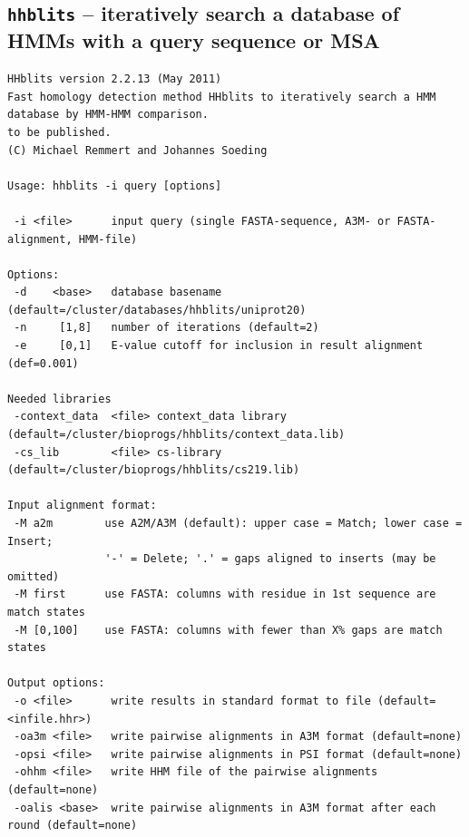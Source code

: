 \documentclass[11pt,a4paper]{article}
\begin{document}
\subsection{{\tt hhblits} -- iteratively search a database of HMMs with a query sequence or MSA}

\small \begin{verbatim}
HHblits version 2.2.13 (May 2011)
Fast homology detection method HHblits to iteratively search a HMM database by HMM-HMM comparison.
to be published.
(C) Michael Remmert and Johannes Soeding

Usage: hhblits -i query [options]                                                             

 -i <file>      input query (single FASTA-sequence, A3M- or FASTA-alignment, HMM-file)   

Options:                                                                                 
 -d    <base>   database basename (default=/cluster/databases/hhblits/uniprot20)                                           
 -n     [1,8]   number of iterations (default=2)                                        
 -e     [0,1]   E-value cutoff for inclusion in result alignment (def=0.001)                

Needed libraries                                                                         
 -context_data  <file> context_data library (default=/cluster/bioprogs/hhblits/context_data.lib)                                 
 -cs_lib        <file> cs-library (default=/cluster/bioprogs/hhblits/cs219.lib)                                           

Input alignment format:                                                       
 -M a2m        use A2M/A3M (default): upper case = Match; lower case = Insert;
               '-' = Delete; '.' = gaps aligned to inserts (may be omitted)   
 -M first      use FASTA: columns with residue in 1st sequence are match states
 -M [0,100]    use FASTA: columns with fewer than X% gaps are match states   

Output options:                                                                          
 -o <file>      write results in standard format to file (default=<infile.hhr>)          
 -oa3m <file>   write pairwise alignments in A3M format (default=none)                   
 -opsi <file>   write pairwise alignments in PSI format (default=none)                   
 -ohhm <file>   write HHM file of the pairwise alignments (default=none)                 
 -oalis <base>  write pairwise alignments in A3M format after each round (default=none)  


\end{verbatim}
\end{document}

